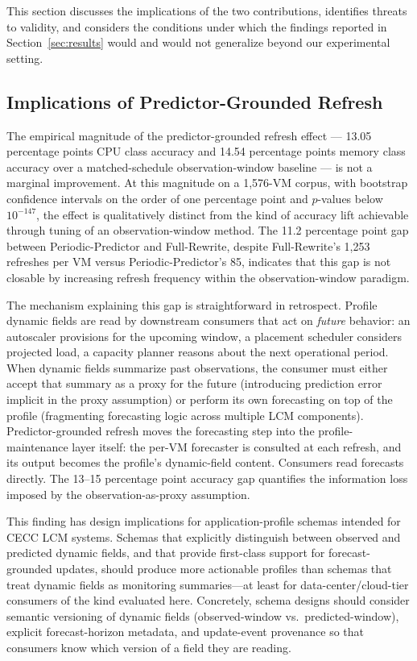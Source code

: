 \documentclass[manuscript,screen,review,anonymous]{acmart}
\begin{document}
This section discusses the implications of the two contributions,
identifies threats to validity, and considers the conditions
under which the findings reported in Section~\ref{sec:results}
would and would not generalize beyond our experimental setting.

\subsection{Implications of Predictor-Grounded Refresh}\label{sec:discussion-pp}

The empirical magnitude of the predictor-grounded refresh
effect --- 13.05 percentage points CPU class accuracy and 14.54
percentage points memory class accuracy over a matched-schedule
observation-window baseline --- is not a marginal improvement.
At this magnitude on a 1{,}576-VM corpus, with bootstrap
confidence intervals on the order of one percentage point and
$p$-values below $10^{-147}$, the effect is qualitatively distinct
from the kind of accuracy lift achievable through tuning of an
observation-window method. The 11.2 percentage point gap between
Periodic-Predictor and Full-Rewrite, despite Full-Rewrite's
1{,}253 refreshes per VM versus Periodic-Predictor's 85, indicates
that this gap is not closable by increasing refresh frequency
within the observation-window paradigm.

The mechanism explaining this gap is straightforward in retrospect.
Profile dynamic fields are read by downstream consumers that act
on \emph{future} behavior: an autoscaler provisions for the
upcoming window, a placement scheduler considers projected load,
a capacity planner reasons about the next operational period.
When dynamic fields summarize past observations, the consumer must
either accept that summary as a proxy for the future (introducing
prediction error implicit in the proxy assumption) or perform its
own forecasting on top of the profile (fragmenting forecasting
logic across multiple LCM components). Predictor-grounded refresh
moves the forecasting step into the profile-maintenance layer
itself: the per-VM forecaster is consulted at each refresh, and
its output becomes the profile's dynamic-field content. Consumers
read forecasts directly. The 13--15 percentage point accuracy gap
quantifies the information loss imposed by the
observation-as-proxy assumption.

This finding has design implications for application-profile
schemas intended for CECC LCM systems. Schemas that explicitly
distinguish between observed and predicted dynamic fields, and
that provide first-class support for forecast-grounded updates,
should produce more actionable profiles than schemas that treat
dynamic fields as monitoring summaries---at least for
data-center/cloud-tier consumers of the kind evaluated here.
Concretely, schema designs should consider semantic versioning of
dynamic fields (observed-window vs.\ predicted-window), explicit
forecast-horizon metadata, and update-event provenance so that
consumers know which version of a field they are reading.
\end{document}
